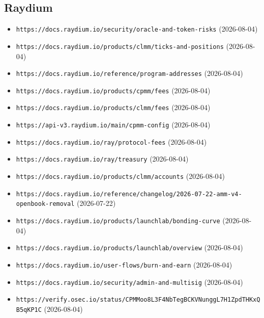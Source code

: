 \subsection*{Raydium}
\begin{itemize}\setlength{\itemsep}{0pt}\small
\item \texttt{https://docs.raydium.io/security/oracle-and-token-risks} (2026-08-04)
\item \texttt{https://docs.raydium.io/products/clmm/ticks-and-positions} (2026-08-04)
\item \texttt{https://docs.raydium.io/reference/program-addresses} (2026-08-04)
\item \texttt{https://docs.raydium.io/products/cpmm/fees} (2026-08-04)
\item \texttt{https://docs.raydium.io/products/clmm/fees} (2026-08-04)
\item \texttt{https://api-v3.raydium.io/main/cpmm-config} (2026-08-04)
\item \texttt{https://docs.raydium.io/ray/protocol-fees} (2026-08-04)
\item \texttt{https://docs.raydium.io/ray/treasury} (2026-08-04)
\item \texttt{https://docs.raydium.io/products/clmm/accounts} (2026-08-04)
\item \texttt{https://docs.raydium.io/reference/changelog/2026-07-22-amm-v4-openbook-removal} (2026-07-22)
\item \texttt{https://docs.raydium.io/products/launchlab/bonding-curve} (2026-08-04)
\item \texttt{https://docs.raydium.io/products/launchlab/overview} (2026-08-04)
\item \texttt{https://docs.raydium.io/user-flows/burn-and-earn} (2026-08-04)
\item \texttt{https://docs.raydium.io/security/admin-and-multisig} (2026-08-04)
\item \texttt{https://verify.osec.io/status/CPMMoo8L3F4NbTegBCKVNunggL7H1ZpdTHKxQB5qKP1C} (2026-08-04)
\end{itemize}

